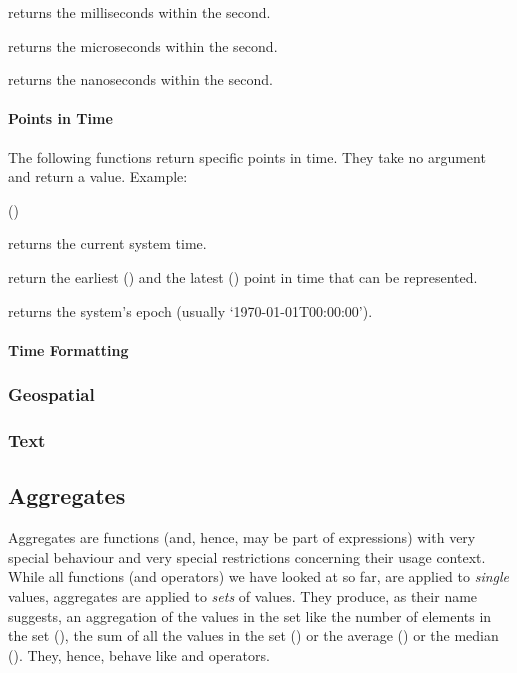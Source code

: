 returns the milliseconds within the second.

returns the microseconds within the second.

returns the nanoseconds within the second.

\paragraph{Points in Time}
The following functions return specific points in time.
They take no argument and return a  value.
Example:

 ()

returns the current system time.

return the earliest () and
the latest () point in time
that can be represented.

returns the system's epoch
(usually `1970-01-01T00:00:00').

\paragraph{Time Formatting}

\subsubsection{Geospatial}

\subsubsection{Text}

\subsection{Aggregates}\label{sec_agg}
Aggregates are functions (and, hence, may be part
of expressions) with very special behaviour and
very special restrictions concerning their usage
context.
While all functions (and operators) we have looked at
so far, are applied to \emph{single} values,
aggregates are applied
to \emph{sets} of values. They produce,
as their name suggests, an aggregation of the
values in the set like the number of elements
in the set (),
the sum of all the values in the set
() or the average ()
or the median ().
They, hence, behave like  and
 operators.

